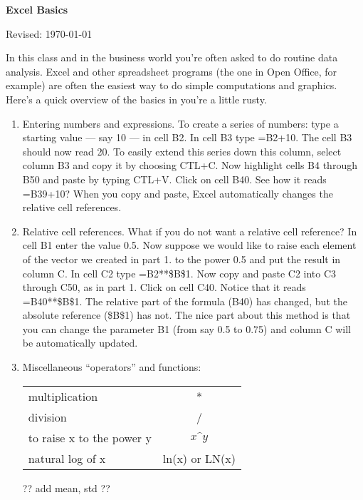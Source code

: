 \documentclass[letterpaper,12pt]{article}
\def\HeadName{Excel Basics}
\begin{document}
\thispagestyle{empty}%
\Head

\centerline{\large \bf \HeadName}%
\centerline{Revised: \today}

\bigskip
In this class and in the business world you're often asked to do 
routine data analysis.  
Excel and other spreadsheet programs (the one in Open Office, for example) 
are often the easiest way to do simple computations and graphics.  
Here's a quick overview of the basics in you're a little rusty.  

\begin{enumerate}

\item Entering numbers and expressions.  
To create a series of numbers: type a starting value --- 
say 10 --- in cell B2.  In cell B3 type =B2+10.  The cell B3 should now read 20.  To easily extend this series down this column, select column B3 and copy it by choosing CTL+C.  Now highlight cells B4 through B50 and paste by typing CTL+V.  Click on cell B40.  See how it reads =B39+10?  
When you copy and paste, Excel automatically changes 
the relative cell references.

\item Relative cell references.  
What if you do not want a relative cell reference?   In cell B1 enter the value 0.5.  Now suppose we would like to raise each element of the vector we created in part 1. to the power 0.5 and put the result in column C.  In cell C2 type =B2**\$B\$1.  Now copy and paste C2 into C3 through C50, as in part 1.  Click on cell C40.  Notice that it reads =B40**\$B\$1.  The relative part of the formula (B40) has changed, but the absolute reference (\$B\$1) has not.  The nice part about this method is that you can change the parameter B1 (from say 0.5 to 0.75) and column C will be automatically updated.

\item Miscellaneous ``operators'' and functions:    

\begin{center}
\begin{tabular}{lc} 
 multiplication & *  \\
 division       & /  \\
 to raise x to the power y  &  $x\widehat{\phantom{g}}y$  \\
 natural log of x &  ln(x) or LN(x)
\end{tabular} 
\end{center} 

?? add mean, std ??


\end{enumerate}
\end{document}

